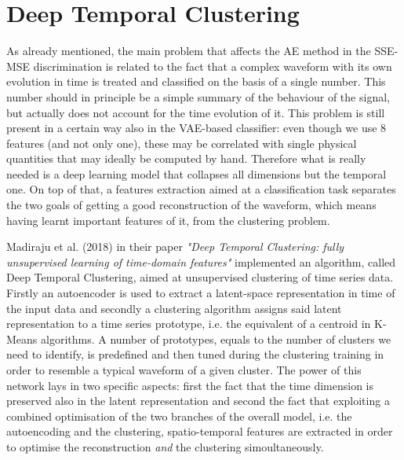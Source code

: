 \section{Deep Temporal Clustering}
\label{sec:DTC}
As already mentioned, the main problem that affects the \ac{AE} method in the \ac{SSE}-\ac{MSE} discrimination is related to the fact that a complex waveform with its own evolution in time is treated and classified on the basis of a single number. This number should in principle be a simple summary of the behaviour of the signal, but actually does not account for the time evolution of it. This problem is still present in a certain way also in the \ac{VAE}-based classifier: even though we use 8 features (and not only one), these may be correlated with single physical quantities that may ideally be computed by hand. Therefore what is really needed is a deep learning model that collapses all dimensions but the temporal one. On top of that, a features extraction aimed at a classification task separates the two goals of getting a good reconstruction of the waveform, which means having learnt important features of it, from the clustering problem.

Madiraju et al. (2018) in their paper \textit{"Deep Temporal Clustering: fully unsupervised learning of time-domain features"} \cite{DTC} implemented an algorithm, called Deep Temporal Clustering, aimed at unsupervised clustering of time series data. Firstly an autoencoder is used to extract a latent-space representation in time of the input data and secondly a clustering algorithm assigns said latent representation to a time series prototype, i.e. the equivalent of a centroid in K-Means algorithms. A number of prototypes, equals to the number of clusters we need to identify, is predefined and then tuned during the clustering training in order to resemble a typical waveform of a given cluster. The power of this network lays in two specific aspects: first the fact that the time dimension is preserved also in the latent representation and second the fact that exploiting a combined optimisation of the two branches of the overall model, i.e. the autoencoding and the clustering, spatio-temporal features are extracted in order to optimise the reconstruction \textit{and} the clustering simoultaneously. 

